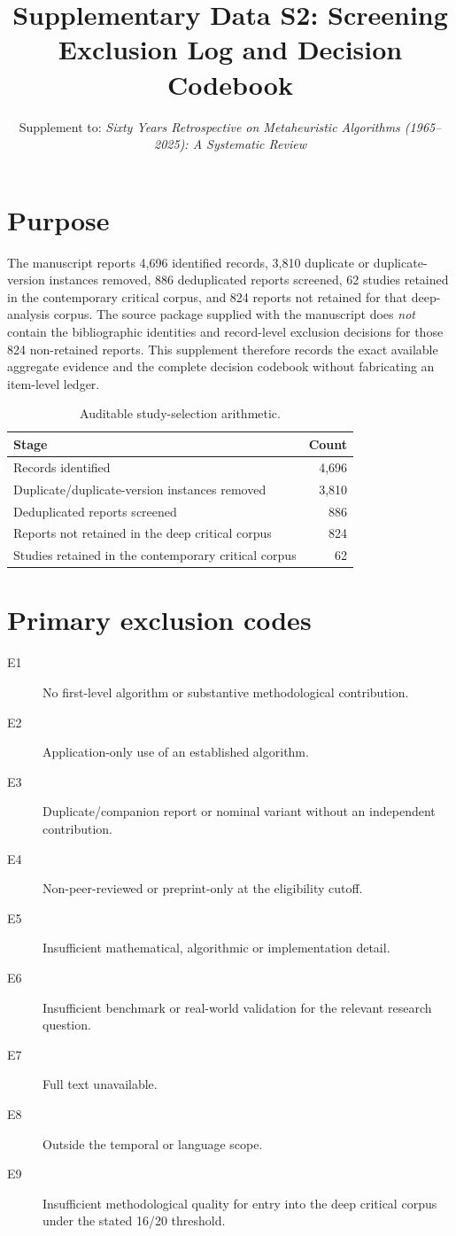 \documentclass[10pt]{article}
\title{Supplementary Data S2: Screening Exclusion Log and Decision Codebook}
\author{Supplement to: \textit{Sixty Years Retrospective on Metaheuristic Algorithms (1965--2025): A Systematic Review}}
\begin{document}
\maketitle
\section*{Purpose}
The manuscript reports 4,696 identified records, 3,810 duplicate or duplicate-version instances removed, 886 deduplicated reports screened, 62 studies retained in the contemporary critical corpus, and 824 reports not retained for that deep-analysis corpus. The source package supplied with the manuscript does \emph{not} contain the bibliographic identities and record-level exclusion decisions for those 824 non-retained reports. This supplement therefore records the exact available aggregate evidence and the complete decision codebook without fabricating an item-level ledger.

\begin{table}[h]
\centering
\caption{Auditable study-selection arithmetic.}
\begin{tabular}{P{8.0cm}r}
\toprule
Stage & Count\\
\midrule
Records identified & 4,696\\
Duplicate/duplicate-version instances removed & 3,810\\
Deduplicated reports screened & 886\\
Reports not retained in the deep critical corpus & 824\\
Studies retained in the contemporary critical corpus & 62\\
\bottomrule
\end{tabular}
\end{table}

\section*{Primary exclusion codes}
\begin{description}
\item[E1] No first-level algorithm or substantive methodological contribution.
\item[E2] Application-only use of an established algorithm.
\item[E3] Duplicate/companion report or nominal variant without an independent contribution.
\item[E4] Non-peer-reviewed or preprint-only at the eligibility cutoff.
\item[E5] Insufficient mathematical, algorithmic or implementation detail.
\item[E6] Insufficient benchmark or real-world validation for the relevant research question.
\item[E7] Full text unavailable.
\item[E8] Outside the temporal or language scope.
\item[E9] Insufficient methodological quality for entry into the deep critical corpus under the stated 16/20 threshold.
\end{description}
\end{document}
